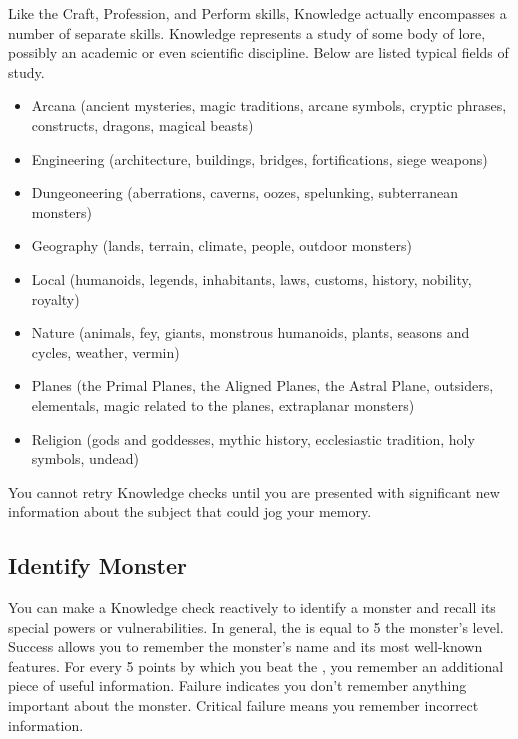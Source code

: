 \newpage
{}
        Like the Craft, Profession, and Perform skills, Knowledge actually encompasses a number of separate skills. Knowledge represents a study of some body of lore, possibly an academic or even scientific discipline. Below are listed typical fields of study.
        \begin{itemize}
            \item Arcana (ancient mysteries, magic traditions, arcane symbols,
                cryptic phrases, constructs, dragons, magical beasts)
            \item Engineering (architecture, buildings, bridges, fortifications, siege weapons)
            \item Dungeoneering (aberrations, caverns, oozes, spelunking, subterranean monsters)
            \item Geography (lands, terrain, climate, people, outdoor monsters)
            \item Local (humanoids, legends, inhabitants, laws, customs, history, nobility, royalty)
            \item Nature (animals, fey, giants, monstrous humanoids, plants, seasons and cycles, weather, vermin)
            \item Planes (the Primal Planes, the Aligned Planes, the Astral Plane,
                outsiders, elementals, magic related to the planes, extraplanar monsters)
            \item Religion (gods and goddesses, mythic history, ecclesiastic tradition, holy symbols, undead)
        \end{itemize}

        You cannot retry Knowledge checks until you are presented with significant new information about the subject that could jog your memory.

    \subsection{Identify Monster}
        You can make a Knowledge check reactively to identify a monster and recall its special powers or vulnerabilities. In general, the  is equal to 5 \add the monster's level. Success allows you to remember the monster's name and its most well-known features. For every 5 points by which you beat the , you remember an additional piece of useful information. Failure indicates you don't remember anything important about the monster. Critical failure means you remember incorrect information.

